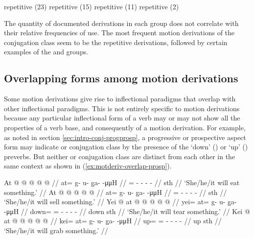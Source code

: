 \documentclass[12pt,letterpaper,oneside,article]{memoir}
\begin{document}
\pex
\a	{} repetitive (23)
\a	{} repetitive (15)
\a	{} repetitive (11)
\a	{} repetitive (2)
\xe

The quantity of documented derivations in each group does not correlate with their relative frequencies of use.
The most frequent motion derivations of the  conjugation class seem to be the  repetitive derivations, followed by certain examples of the  and  groups.



\subsection{Overlapping forms among motion derivations}\label{sec:motderiv-overlap}

Some motion derivations give rise to inflectional paradigms that overlap with other inflectional paradigms.
This is not entirely specific to motion derivations because any particular inflectional form of a verb may or may not show all the properties of a verb base, and consequently of a motion derivation.
For example, as noted in section \ref{sec:intro-conj-progprosp}, a progressive or prospective aspect form may indicate  or  conjugation class by the presence of the  ‘down’ () or  ‘up’ () preverbs.
But neither  or  conjugation class are distinct from each other in the same context as shown in (\ref{ex:motderiv-overlap-prosp}).

\pex\label{ex:motderiv-overlap-prosp}%
\a\label{ex:motderiv-overlap-prosp-z}%
%
\begingl
	\gla	At @  @ {} @ {} @ {} @ {} //
	\glb	at= g- u- g̱a-  -μμH //
	\glc	{}= - - -  - //
	\gld	sth\•  {} {} {} {} //
	\glft	‘She/he/it will eat something.’
		//
\endgl
\a\label{ex:motderiv-overlap-prosp-n}%
%
\begingl
	\gla	At @  @ {} @ {} @ {} @ {} //
	\glb	at= g- u- g̱a-  -μμH //
	\glc	{}= - - -  - //
	\gld	sth\•  {} {} {} {} //
	\glft	‘She/he/it will sell something.’
		//
\endgl
\a\label{ex:motderiv-overlap-prosp-gh}%
%
\begingl
	\gla	Yei @ at @  @ {} @ {} @ {} @ {} //
	\glb	yei= at= g- u- g̱a-  -μμH //
	\glc	down= = - - -  - //
	\gld	down\• sth\•  {} {} {} {} //
	\glft	‘She/he/it will tear something.’
		//
\endgl
\a\label{ex:motderiv-overlap-prosp-g}%
%
\begingl
	\gla	Kei @ at @  @ {} @ {} @ {} @ {} //
	\glb	kei= at= g- u- g̱a-  -μμH //
	\glc	up= = - - -  - //
	\gld	up\• sth\•  {} {} {} {} //
	\glft	‘She/he/it will grab something.’
		//
\endgl
\xe
\end{document}
